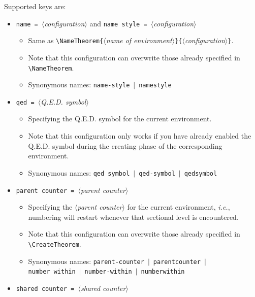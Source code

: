 \documentclass[classical]{einfart}
\newcommand{\meta}[1]{$\langle${\normalfont\itshape#1}$\rangle$}
\newcommand{\commandoption}[1]{\texttt{\textcolor{code-keys}{#1}}}
\begin{document}
Supported keys are:
\vspace{-.2\baselineskip}
\begin{itemize}[label=,leftmargin=1.25em,itemindent=-1.25em]
    \item \commandoption{name}\lstinline| = |\meta{configuration} and \commandoption{name style}\lstinline| = |\meta{configuration}
        \begin{itemize}
            \item Same as \lstinline|\NameTheorem{|\meta{name of environment}\lstinline|}{|\meta{configuration}\lstinline|}|.
            \item Note that this configuration can overwrite those already specified in \lstinline|\NameTheorem|.
            \item Synonymous names: \commandoption{name-style} \,$|$\, \commandoption{namestyle}
        \end{itemize}
    \item \commandoption{qed}\lstinline| = |\meta{Q.E.D. symbol}
        \begin{itemize}
            \item Specifying the Q.E.D. symbol for the current environment.
            \item Note that this configuration only works if you have already enabled the Q.E.D. symbol during the creating phase of the corresponding environment.
            \item Synonymous names: \commandoption{qed symbol} \,$|$\, \commandoption{qed-symbol} \,$|$\, \commandoption{qedsymbol}
        \end{itemize}
    \item \commandoption{parent counter}\lstinline| = |\meta{parent counter}
        \begin{itemize}
            \item Specifying the \meta{parent counter} for the current environment, \emph{i.e.}, numbering will restart whenever that sectional level is encountered.
            \item Note that this configuration can overwrite those already specified in \lstinline|\CreateTheorem|.
            \item Synonymous names: \commandoption{parent-counter} \,$|$\, \commandoption{parentcounter} \,$|$\, \\\phantom{Synonymous names: }\commandoption{number within} \,$|$\, \commandoption{number-within} \,$|$\, \commandoption{numberwithin}
        \end{itemize}
    \item \commandoption{shared counter}\lstinline| = |\meta{shared counter}

\end{itemize}
\end{document}
